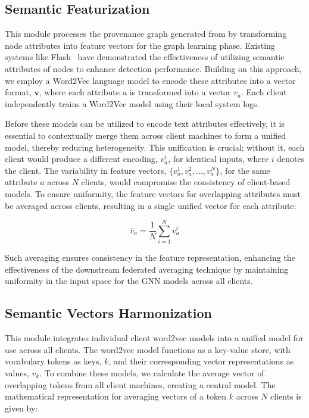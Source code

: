 \subsection{Semantic Featurization}
\label{semanfeat}

This module processes the provenance graph generated from \logs by transforming node attributes into feature vectors for the graph learning phase. Existing systems like Flash~\cite{flash2024} have demonstrated the effectiveness of utilizing semantic attributes of nodes to enhance detection performance. Building on this approach, we employ a Word2Vec language model to encode these attributes into a vector format, \(\mathbf{v}\), where each attribute \(a\) is transformed into a vector \(v_a\). Each client independently trains a Word2Vec model using their local system logs.

Before these models can be utilized to encode text attributes effectively, it is essential to contextually merge them across client machines to form a unified model, thereby reducing heterogeneity. This unification is crucial; without it, each client would produce a different encoding, \(v_a^i\), for identical inputs, where \(i\) denotes the client. The variability in feature vectors, \(\{v_a^1, v_a^2, \ldots, v_a^N\}\), for the same attribute \(a\) across \(N\) clients, would compromise the consistency of client-based \gnnshort models. To ensure uniformity, the feature vectors for overlapping attributes must be averaged across clients, resulting in a single unified vector for each attribute:

\[
\bar{v}_a = \frac{1}{N} \sum_{i=1}^{N} v_a^i
\]

Such averaging ensures consistency in the feature representation, enhancing the effectiveness of the downstream federated averaging technique by maintaining uniformity in the input space for the GNN models across all clients.

\subsection{Semantic Vectors Harmonization}
\label{semanticharmonization}

This module integrates individual client word2vec models into a unified model for use across all clients. The word2vec model functions as a key-value store, with vocabulary tokens as keys, \(k\), and their corresponding vector representations as values, \(v_k\). To combine these models, we calculate the average vector of overlapping tokens from all client machines, creating a central model. The mathematical representation for averaging vectors of a token \(k\) across \(N\) clients is given by:

